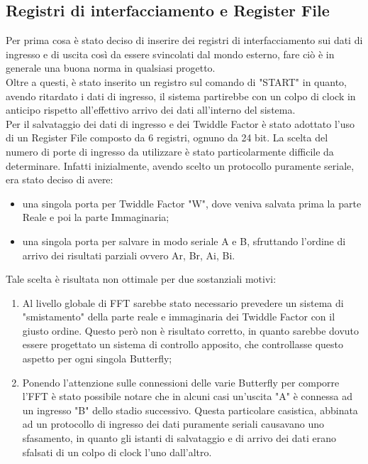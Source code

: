 \documentclass[a4paper, titlepage]{article}
\begin{document}
\subsection{Registri di interfacciamento e Register File}%
Per prima cosa è stato deciso di inserire dei registri di interfacciamento sui dati di ingresso e di uscita così da essere svincolati dal mondo esterno, fare ciò è in generale una buona norma in qualsiasi progetto.\\ Oltre a questi, è stato inserito un registro sul comando di "START" in quanto, avendo ritardato i dati di ingresso, il sistema partirebbe con un colpo di clock in anticipo rispetto all'effettivo arrivo dei dati all'interno del sistema.\\
Per il salvataggio dei dati di ingresso e dei Twiddle Factor è stato adottato l'uso di un Register File composto da 6 registri, ognuno da 24 bit. La scelta del numero di porte di ingresso da utilizzare è stato particolarmente difficile da determinare. Infatti inizialmente, avendo scelto un protocollo puramente seriale, era stato deciso di avere:
\begin{itemize}
    \item una singola porta per Twiddle Factor "W", dove veniva salvata prima la parte Reale e poi la parte Immaginaria;
    \item una singola porta per salvare in modo seriale A e B, sfruttando l'ordine di arrivo dei risultati parziali ovvero Ar, Br, Ai, Bi.
\end{itemize}
Tale scelta è risultata non ottimale per due sostanziali motivi:
\begin{enumerate}
    \item Al livello globale di FFT sarebbe stato necessario prevedere un sistema di "smistamento" della parte reale e immaginaria dei Twiddle Factor con il giusto ordine. Questo però non è risultato corretto, in quanto sarebbe dovuto essere progettato un sistema di controllo apposito,
    che controllasse questo aspetto per ogni singola Butterfly;
    \item Ponendo l'attenzione sulle connessioni delle varie Butterfly per comporre l'FFT è stato possibile notare che in alcuni casi un'uscita "A" è connessa ad un ingresso "B" dello stadio successivo. Questa particolare casistica, abbinata ad un protocollo di ingresso dei dati puramente seriali causavano uno sfasamento, in quanto gli istanti di salvataggio e di arrivo dei dati erano sfalsati di un colpo di clock l'uno dall'altro.
\end{enumerate}
\end{document}
